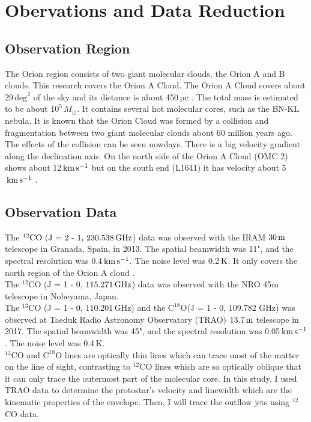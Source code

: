 \section{Obervations and Data Reduction}

\subsection{Observation Region}
The Orion region consists of two giant molecular clouds, the Orion A and B clouds. This research covers the Orion A Cloud. The Orion A Cloud covers about $29 \, \textrm{deg}^2$ of the sky and its distance is about 450$\,$pc \cite{kounkel2017gould}. The total mass is estimated to be about $10^5 \, M_{\odot}$. It contains several hot molecular cores, such as the BN-KL nebula. It is known that the Orion Cloud was formed by a collision and fragmentation between two giant molecular clouds about 60 million years ago. The effects of the collision can be seen nowdays. There is a big velocity gradient along the declination axis. On the north side of the Orion A Cloud (OMC 2) shows about 12$\, \rm km\,s^{-1}$ but on the south end (L1641) it has velocity about 5$\, \rm km\,s^{-1}$ \cite{schulz2012formation}.

\subsection{Observation Data}
The $^{12}\textrm{CO (J = 2 - 1, 230.538\,GHz}$) data was observed with the IRAM $\textrm{30\,m}$ telescope in Granada, Spain, in 2013. The spatial beamwidth was 11", and the spectral resolution was 0.4$\, \rm km\,s^{-1}$. The noise level was 0.2$\, \rm K$. It only covers the north region of the Orion A cloud \cite{berne2014iram}. \\
The $^{12}$CO (J = 1 - 0, $115.271\, \rm GHz$) data was observed with the NRO 45m telescope in Nobeyama, Japan.  \\
The $^{13}$CO (J = 1 - 0, $110.201\,$GHz) and the $\textrm{C}^{18}\textrm{O}$(J = 1 - 0, 109.782 GHz) was observed at Taeduk Radio Astronomy Observatory (TRAO)  $\textrm{13.7\,m}$ telescope in 2017. The spatial beamwidth was 45", and the spectral resolution was 0.05$\, \rm km\,s^{-1}$. The noise level was 0.4$\,$K.\\
$^{13}$CO and $\textrm{C}^{18}\textrm{O}$ lines are optically thin lines which can trace most of the matter on the line of sight, contrasting to $^{12}$CO lines which are so optically oblique that it can only trace the outermost part of the molecular core. In this study, I used TRAO data to determine the protostar's velocity and linewidth which are the kinematic properties of the envelope. Then, I will trace the outflow jets using $^{12}$CO data.

